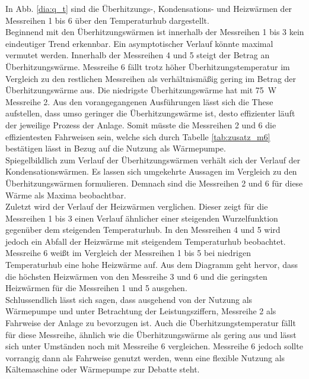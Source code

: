 In Abb. \ref{dia:q_t} sind die Überhitzungs-, Kondensations- und Heizwärmen der Messreihen 1 bis 6 über den Temperaturhub dargestellt.\\
Beginnend mit den Überhitzungswärmen ist innerhalb der Messreihen 1 bis 3 kein eindeutiger Trend erkennbar. Ein asymptotischer Verlauf könnte maximal vermutet werden. Innerhalb der Messreihen 4 und 5 steigt der Betrag an Überhitzungswärme. Messreihe 6 fällt trotz höher Überhitzungstemperatur im Vergleich zu den restlichen Messreihen als verhältnismäßig gering im Betrag der Überhitzungswärme aus. Die niedrigste Überhitzungswärme hat mit \SI{75}{\watt} Messreihe 2. Aus den vorangegangenen Ausführungen lässt sich die These aufstellen, dass umso geringer die Überhitzungswärme ist, desto effizienter läuft der jeweilige Prozess der Anlage. Somit müsste die Messreihen 2 und 6 die effizientesten Fahrweisen sein, welche sich durch Tabelle \ref{tab:zusatz_m6} bestätigen lässt in Bezug auf die Nutzung als Wärmepumpe.\\
Spiegelbildlich zum Verlauf der Überhitzungswärmen verhält sich der Verlauf der Kondensationswärmen. Es lassen sich umgekehrte Aussagen im Vergleich zu den Überhitzungswärmen formulieren. Demnach sind die Messreihen 2 und 6 für diese Wärme als Maxima beobachtbar.\\
Zuletzt wird der Verlauf der Heizwärmen verglichen. Dieser zeigt für die Messreihen 1 bis 3 einen Verlauf ähnlicher einer steigenden Wurzelfunktion gegenüber dem steigenden Temperaturhub. In den Messreihen 4 und 5 wird jedoch ein Abfall der Heizwärme mit steigendem Temperaturhub beobachtet. Messreihe 6  weißt im Vergleich der Messreihen 1 bis 5 bei niedrigen Temperaturhub eine hohe Heizwärme auf.
Aus dem Diagramm geht hervor, dass die höchsten Heizwärmen von den Messreihe 3 und 6 und die geringsten Heizwärmen für die Messreihen 1 und 5 ausgehen.\\
Schlussendlich lässt sich sagen, dass ausgehend von der Nutzung als Wärmepumpe und unter Betrachtung der Leistungsziffern, Messreihe 2 als Fahrweise der Anlage zu bevorzugen ist. Auch die Überhitzungstemperatur fällt für diese Messreihe, ähnlich wie die Überhitzungswärme als gering aus und lässt sich unter Umständen noch mit Messreihe 6 vergleichen. Messreihe 6 jedoch sollte vorrangig dann als Fahrweise genutzt werden, wenn eine flexible Nutzung als Kältemaschine oder Wärmepumpe zur Debatte steht.